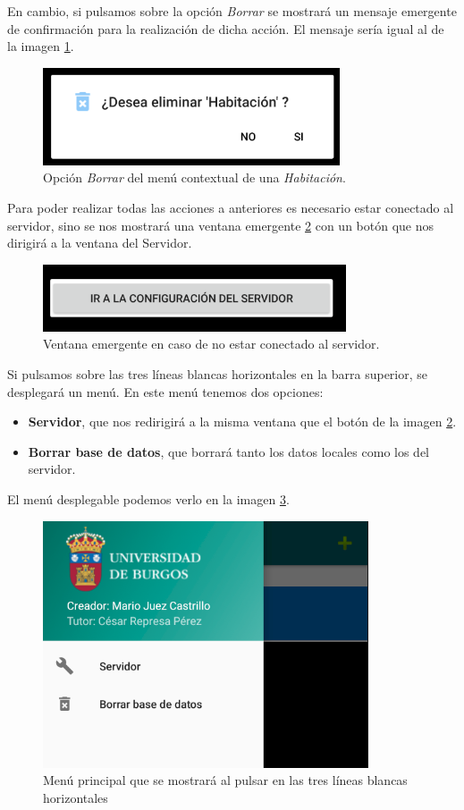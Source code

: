 En cambio, si pulsamos sobre la opción \textit{Borrar} se mostrará un mensaje emergente de confirmación para la realización de dicha acción. El mensaje sería igual al de la imagen \ref{fig:borrar}.

\begin{figure}[h!]
	\centering
	\includegraphics[width=0.6\linewidth]{img/borrar}
	\caption{Opción \textit{Borrar} del menú contextual de una \textit{Habitación}.}
	\label{fig:borrar}
\end{figure}

Para poder realizar todas las acciones a anteriores es necesario estar conectado al servidor, sino se nos mostrará una ventana emergente \ref{fig:ventanaEmergenteError} con un botón que nos dirigirá a la ventana del Servidor. 

\begin{figure}[h!]
	\centering
	\includegraphics[width=0.6\linewidth]{img/ventanaEmergenteError}
	\caption{Ventana emergente en caso de no estar conectado al servidor.}
	\label{fig:ventanaEmergenteError}
\end{figure}

Si pulsamos sobre las tres líneas blancas horizontales en la barra superior, se desplegará un menú. En este menú tenemos dos opciones:

\begin{itemize}
	\item \textbf{Servidor}, que nos redirigirá a la misma ventana que el botón de la imagen \ref{fig:ventanaEmergenteError}.
	\item \textbf{Borrar base de datos}, que borrará tanto los datos locales como los del servidor.
\end{itemize}

El menú desplegable podemos verlo en la imagen \ref{fig:menuPrincipal}.

\begin{figure}[h!]
	\centering
	\includegraphics[width=0.6\linewidth]{img/menuPrincipal}
	\caption{Menú principal que se mostrará al pulsar en las tres líneas blancas horizontales}
	\label{fig:menuPrincipal}
\end{figure}

